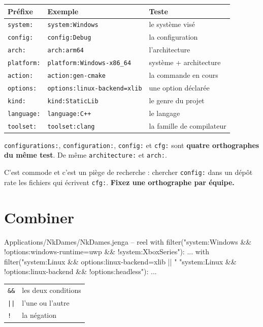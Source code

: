 \begin{center}
\begin{tabular}{@{}lll@{}}
\toprule
\textbf{Préfixe} & \textbf{Exemple} & \textbf{Teste} \\
\midrule
\texttt{system:} & \texttt{system:Windows} & le système visé \\
\texttt{config:} & \texttt{config:Debug} & la configuration \\
\texttt{arch:} & \texttt{arch:arm64} & l'architecture \\
\texttt{platform:} & \texttt{platform:Windows-x86\_64} & système + architecture \\
\texttt{action:} & \texttt{action:gen-cmake} & la commande en cours \\
\texttt{options:} & \texttt{options:linux-backend=xlib} & une option déclarée \\
\texttt{kind:} & \texttt{kind:StaticLib} & le genre du projet \\
\texttt{language:} & \texttt{language:C++} & le langage \\
\texttt{toolset:} & \texttt{toolset:clang} & la famille de compilateur \\
\bottomrule
\end{tabular}
\end{center}

\begin{nkretenir}
\texttt{configurations:}, \texttt{configuration:}, \texttt{config:} et
\texttt{cfg:} sont \textbf{quatre orthographes du même test}. De même
\texttt{architecture:} et \texttt{arch:}.

C'est commode et c'est un piège de recherche : chercher \texttt{config:} dans un
dépôt rate les fichiers qui écrivent \texttt{cfg:}. \textbf{Fixez une orthographe
par équipe.}
\end{nkretenir}

\section{Combiner}

\begin{nkcode}{Applications/NkDames/NkDames.jenga -- reel}
with filter("system:Windows && !options:windows-runtime=uwp && !system:XboxSeries"):
    ...
with filter("system:Linux && options:linux-backend=xlib || "
            "system:Linux && !options:linux-backend && !options:headless"):
    ...
\end{nkcode}

\begin{center}
\begin{tabular}{@{}ll@{}}
\toprule
\texttt{\&\&} & les deux conditions \\
\texttt{||} & l'une ou l'autre \\
\texttt{!} & la négation \\
\bottomrule
\end{tabular}
\end{center}

